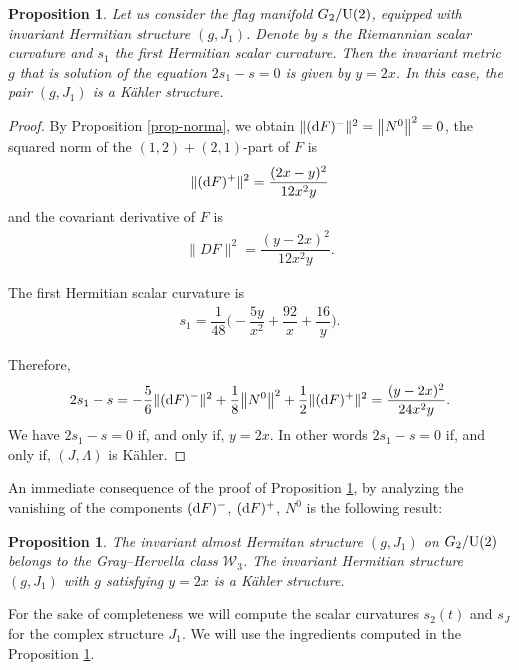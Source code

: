 \documentclass[10pt,a4paper]{amsart}
\numberwithin{equation}{section}
\newtheorem{Proposition}[Theorem]{Proposition}
 { \theoremstyle{definition}
\newtheorem{Definition}[Theorem]{Definition}
\newtheorem{Question}[Theorem]{Question}
\newtheorem*{Notation}{Notation}
\newtheorem{Example}[Theorem]{Example}
\newtheorem{Remark}[Theorem]{Remark} }
\begin{document}
\begin{Proposition} \label{prop-g2-j1}
Let us consider the flag manifold $G_{2}/{\rm U}(2)$, equipped with invariant Hermitian structure $(g, J_{1})$. Denote by $s$ the Riemannian scalar curvature and $s_1$ the first Hermitian scalar curvature. Then the invariant metric $g$ that is solution of the equation $2s_1-s=0$ is given by $y=2x$. In this case, the pair $(g, J_{1})$ is a K\"ahler structure.
\end{Proposition}
\begin{proof}
By Proposition \ref{prop-norma}, we obtain $\|({\rm d}F)^{-}\|^{2}=\big\|N^{0}\big\|^{2}=0$, the squared norm of the $(1,2)+(2,1)$-part of $F$ is
\begin{gather*}
\|({\rm d}F)^{+}\|^{2}=\dfrac{(2 x-y)^2}{12 x^2 y}
\end{gather*}
and the covariant derivative of $F$ is
\begin{gather*}
\|DF\|^{2}=\dfrac{(y-2 x)^2}{12 x^2 y}.
\end{gather*}

The first Hermitian scalar curvature is
\begin{gather*}
s_{1}=\dfrac{1}{48} \bigg({-}\dfrac{5 y}{x^2}+\dfrac{92}{x}+\dfrac{16}{y}\bigg).
\end{gather*}

Therefore,
\begin{align*}
2s_{1}-s=-\dfrac{5}{6}\|({\rm d}F)^{-}\|^{2}+\dfrac{1}{8}\big\|N^{0}\big\|^{2}+\dfrac{1}{2}\|({\rm d}F)^{+}\|^{2}
=\dfrac{(y-2 x)^2}{24 x^2 y}.
\end{align*}
We have $2s_{1}-s=0$ if, and only if, $y=2x$. In other words $2s_{1}-s=0$ if, and only if, $(J,\Lambda)$ is K\"ahler.
\end{proof}

An immediate consequence of the proof of Proposition \ref{prop-g2-j1}, by analyzing the vanishing of the components $({\rm d}F)^{-}$, $({\rm d}F)^{+}$, $N^0$ is the following result:
\begin{Proposition}
The invariant almost Hermitan structure $(g, J_{1})$ on $G_{2}/{\rm U}(2)$ belongs to the Gray--Hervella class $\mathcal{W}_{3}$. The invariant Hermitian structure $(g, J_{1})$ with $g$ satisfying $y=2x$ is a K\"ahler structure.
\end{Proposition}


For the sake of completeness we will compute the scalar curvatures $s_2(t)$ and $s_J$ for the complex structure $J_1$. We will use the ingredients computed in the Proposition \ref{prop-g2-j1}.
\end{document}
